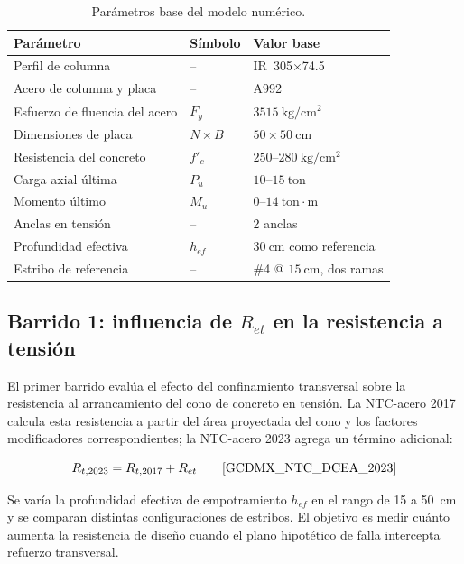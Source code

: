 \begin{table}[H]
  \centering
  \caption{Parámetros base del modelo numérico.}
  \label{tab:caso_base_metodologia}
  \begin{tabular}{p{} p{} p{}}
    \toprule
    \textbf{Parámetro} & \textbf{Símbolo} & \textbf{Valor base} \\
    \midrule
    Perfil de columna & -- & IR~305$\times$74.5 \\
    Acero de columna y placa & -- & A992 \\
    Esfuerzo de fluencia del acero & $F_y$ & $3515~\mathrm{kg/cm^2}$ \\
    Dimensiones de placa & $N\times B$ & $50\times50~\mathrm{cm}$ \\
    Resistencia del concreto & $f'_c$ & $250$--$280~\mathrm{kg/cm^2}$ \\
    Carga axial última & $P_u$ & $10$--$15~\mathrm{ton}$ \\
    Momento último & $M_u$ & $0$--$14~\mathrm{ton{\cdot}m}$ \\
    Anclas en tensión & -- & 2 anclas \\
    Profundidad efectiva & $h_{ef}$ & $30~\mathrm{cm}$ como referencia \\
    Estribo de referencia & -- & \#4 @ $15~\mathrm{cm}$, dos ramas \\
    \bottomrule
  \end{tabular}
\end{table}

\subsection{Barrido 1: influencia de \texorpdfstring{$R_{et}$}{Ret} en la resistencia a tensión}

El primer barrido evalúa el efecto del confinamiento transversal sobre la resistencia al
arrancamiento del cono de concreto en tensión. La NTC-acero 2017 calcula esta resistencia a partir
del área proyectada del cono y los factores modificadores correspondientes; la NTC-acero 2023 agrega
un término adicional:

\begin{equation}
  R_{t,2023}=R_{t,2017}+R_{et}
  \qquad \text{\cite{GCDMX_NTC_DCEA_2023}}
  \label{eq:met_Rt2023}
\end{equation}

Se varía la profundidad efectiva de empotramiento $h_{ef}$ en el rango de 15 a 50~cm y se comparan
distintas configuraciones de estribos. El objetivo es medir cuánto aumenta la resistencia de diseño
cuando el plano hipotético de falla intercepta refuerzo transversal.

